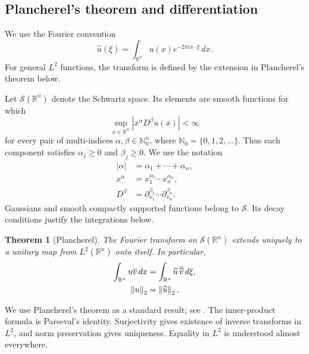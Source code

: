 \documentclass[11pt]{article}
\numberwithin{equation}{section}
\newtheorem{theorem}{Theorem}[section]
\theoremstyle{definition}
\theoremstyle{remark}
\newcommand{\R}{\mathbb R}
\newcommand{\Sch}{\mathcal S}
\newcommand{\dd}{\,d}
\newcommand{\norm}[1]{\left\|#1\right\|}
\newcommand{\wh}[1]{\widehat{#1}}
\begin{document}
\subsection{Plancherel's theorem and differentiation}
We use the Fourier convention
\[
 \wh u(\xi)=\int_{\R^n}u(x)e^{-2\pi i x\cdot\xi}\dd x.
\]
For general \(L^2\) functions, the transform is defined by the extension in Plancherel's theorem below.

\begin{samepage}
Let \(\Sch(\R^n)\) denote the Schwartz space. Its elements are smooth functions for which
\[
 \sup_{x\in\R^n}|x^\alpha D^\beta u(x)|<\infty
\]
for every pair of multi-indices \(\alpha,\beta\in\mathbb N_0^n\), where \(\mathbb N_0=\{0,1,2,\ldots\}\). Thus each component satisfies \(\alpha_j\ge0\) and \(\beta_j\ge0\). We use the notation
\begin{align*}
 |\alpha|&=\alpha_1+\cdots+\alpha_n,\\
 x^\alpha&=x_1^{\alpha_1}\cdots x_n^{\alpha_n},\\
 D^\beta&=\partial_{x_1}^{\beta_1}\cdots\partial_{x_n}^{\beta_n}.
\end{align*}
Gaussians and smooth compactly supported functions belong to \(\Sch\). Its decay conditions justify the integrations below.
\end{samepage}

\begin{theorem}[Plancherel]
The Fourier transform on \(\Sch(\R^n)\) extends uniquely to a unitary map from \(L^2(\R^n)\) onto itself. In particular,
\begin{align}
 \int_{\R^n}u\overline v\dd x
   &=\int_{\R^n}\wh u\,\overline{\wh v}\dd\xi,\label{eq:parseval}\\
 \norm{u}_2&=\norm{\wh u}_2.\notag
\end{align}
\end{theorem}
We use Plancherel's theorem as a standard result; see \cite[Section 6]{project}. The inner-product formula is Parseval's identity. Surjectivity gives existence of inverse transforms in \(L^2\), and norm preservation gives uniqueness. Equality in \(L^2\) is understood almost everywhere.
\end{document}
